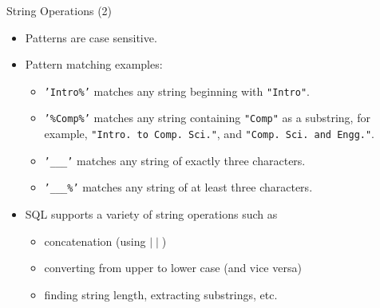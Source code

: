 \documentclass[aspectratio=169, xcolor=dvipsnames]{beamer}
\begin{document}
\begin{frame}{String Operations (2)}
    \begin{itemize}[<+->]
        \item Patterns are case sensitive.
        \item Pattern matching examples:
        \begin{itemize}
            \item[$\triangleright$] \texttt{'Intro\%'} matches any string beginning with \texttt{"Intro"}.
            \item[$\triangleright$] \texttt{'\%Comp\%'} matches any string containing \texttt{"Comp"} as a substring, for example, \texttt{"Intro. to Comp. Sci."}, and \texttt{"Comp. Sci. and Engg."}.
            \item[$\triangleright$] \texttt{'\_\_\_'} matches any string of exactly three characters.
            \item[$\triangleright$] \texttt{'\_\_\_\%'} matches any string of at least three characters.
        \end{itemize}
        \item SQL supports a variety of string operations such as
        \begin{itemize}
            \item[$\triangleright$] concatenation (using $\mid\mid$)
            \item[$\triangleright$] converting from upper to lower case (and vice versa)
            \item[$\triangleright$] finding string length, extracting substrings, etc.
        \end{itemize}
    \end{itemize}
\end{frame}
\end{document}
